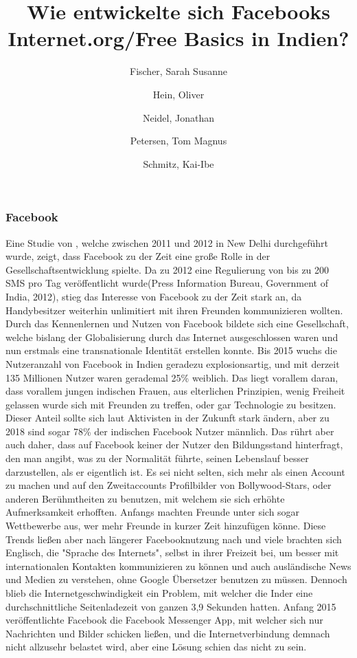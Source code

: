 \documentclass{article}
\title{Wie entwickelte sich Facebooks Internet.org/Free Basics in Indien?}
\author{
  Fischer, Sarah Susanne\\
  \and
  Hein, Oliver\\
  \and
  Neidel, Jonathan\\
  \and
  Petersen, Tom Magnus\\
  \and
  Schmitz, Kai-Ibe\\
}
\begin{document}
\maketitle
\subsubsection {Facebook}
Eine Studie von \textcite{empowermentThroughFacebook}, welche zwischen 2011 und 2012 in New Delhi durchgeführt wurde, zeigt, dass Facebook zu der Zeit eine große Rolle in der Gesellschaftsentwicklung spielte. 
\medskip
Da zu 2012 eine Regulierung von bis zu 200 SMS pro Tag veröffentlicht wurde(Press Information Bureau,
Government of India, 2012), stieg das Interesse von Facebook zu der Zeit stark an,
da Handybesitzer weiterhin unlimitiert mit ihren Freunden kommunizieren wollten.
Durch das Kennenlernen und Nutzen von Facebook bildete sich eine Gesellschaft, welche bislang der Globalisierung
durch das Internet ausgeschlossen waren und nun erstmals eine transnationale Identität erstellen konnte.
\medskip
Bis 2015 wuchs die Nutzeranzahl von Facebook in Indien geradezu explosionsartig, und mit derzeit 135 Millionen Nutzer waren gerademal 25\% weiblich\autocite{slideshareIndia}. Das liegt vorallem daran, dass vorallem jungen indischen Frauen, aus elterlichen Prinzipien, 
wenig Freiheit gelassen wurde sich mit Freunden zu treffen, oder gar Technologie
zu besitzen. Dieser Anteil sollte sich laut Aktivisten in der Zukunft stark ändern, 
aber zu 2018 sind sogar 78\% der indischen Facebook Nutzer männlich. 
\medskip
Das rührt aber auch daher, dass auf Facebook keiner der Nutzer den Bildungsstand hinterfragt, den man angibt, was zu der Normalität führte, seinen Lebenslauf besser darzustellen, als er eigentlich ist. Es sei nicht selten, sich mehr als einen Account zu machen und auf den Zweitaccounts Profilbilder von Bollywood-Stars, oder anderen Berühmtheiten zu benutzen,
mit welchem sie sich erhöhte Aufmerksamkeit erhofften. 
Anfangs machten Freunde unter sich sogar Wettbewerbe aus, wer mehr Freunde in kurzer Zeit hinzufügen könne.
Diese Trends ließen aber nach längerer Facebooknutzung nach und viele brachten sich Englisch, die "Sprache des Internets", 
selbst in ihrer Freizeit bei, um besser mit internationalen Kontakten
kommunizieren zu können und auch ausländische News und Medien zu verstehen, ohne Google Übersetzer benutzen zu müssen.
\medskip
Dennoch blieb die Internetgeschwindigkeit ein Problem, mit welcher die Inder eine durchschnittliche Seitenladezeit von ganzen 3,9 Sekunden hatten\autocite{mashable}. Anfang 2015 veröffentlichte Facebook die Facebook Messenger App, mit welcher sich nur Nachrichten und Bilder schicken ließen, und die Internetverbindung demnach nicht allzusehr belastet wird, aber eine Lösung schien das nicht zu sein.
\medskip



\end{document}
